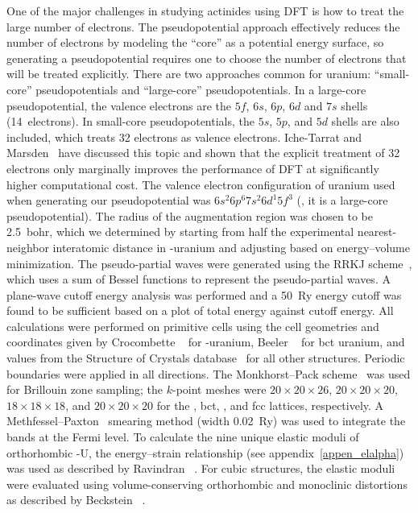 One of the major challenges in studying actinides using DFT is how to treat the
large number of electrons. The pseudopotential approach effectively reduces the
number of electrons by modeling the ``core'' as a potential energy surface,
so generating a pseudopotential requires one to choose the number of electrons
that will be treated explicitly. There are two approaches common for uranium:
``small-core'' pseudopotentials and ``large-core'' pseudopotentials. In a
large-core pseudopotential, the valence electrons are the $5f$, $6s$, $6p$,
$6d$ and $7s$ shells (14~electrons). In small-core pseudopotentials, the $5s$,
$5p$, and $5d$ shells are also included, which treats 32 electrons as valence
electrons. Iche-Tarrat and Marsden~\cite{iche2008examining} have discussed this
topic and shown that the explicit treatment of 32 electrons only marginally
improves the performance of DFT at significantly higher computational cost.
The valence electron configuration of uranium used when generating our
pseudopotential was $6s^2 6p^6 7s^2 6d^1 5f^3$ (\ie, it is a large-core
pseudopotential).
The radius of the augmentation region was chosen to be 2.5~bohr,
which we determined by starting from half the experimental nearest-neighbor
interatomic distance in \textalpha-uranium and adjusting based on
energy--volume minimization.
The pseudo-partial waves were generated using the RRKJ
scheme~\cite{rappe1990optimized}, which uses a sum of Bessel functions to
represent the pseudo-partial waves.
A plane-wave cutoff energy analysis was performed and a 50~Ry energy cutoff was
found to be sufficient based on a plot of total energy against cutoff energy.
All calculations were performed on primitive cells using the cell geometries
and coordinates given by Crocombette \etal~\cite{crocombette2001plane} for
\textalpha-uranium, Beeler \etal~\cite{beeler2013first} for bct uranium, and
values from the Structure of Crystals database~\cite{StructureofCrystals} for
all other structures.
Periodic boundaries were applied in all directions.
The Monkhorst--Pack scheme~\cite{pack1977special} was used for Brillouin zone
sampling; the $k$-point meshes were $20\times20\times26$, $20\times20\times20$,
$18\times18\times18$, and $20\times20\times20$ for the \textalpha, bct,
\textgamma, and fcc lattices, respectively. A
Methfessel--Paxton~\cite{methfessel1989high} smearing method (width 0.02~Ry)
was used to integrate the bands at the Fermi level.
To calculate the nine unique elastic moduli of orthorhombic \textalpha-U,
the energy--strain relationship (see appendix~\ref{appen_elalpha}) was used as described by Ravindran
\etal~\cite{ravindran1998density}.
For cubic structures, the elastic moduli were evaluated using
volume-conserving orthorhombic and monoclinic distortions  as described by
Beckstein \etal~\cite{beckstein2001first}.

